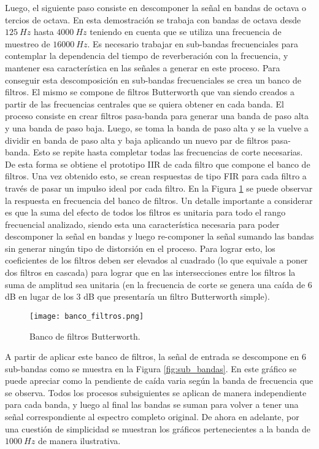 Luego, el siguiente paso consiste en descomponer la señal en bandas de octava o tercios de octava. En esta demostración se trabaja con bandas de octava desde $125 \ Hz$ hasta $4000 \ Hz$ teniendo en cuenta que se utiliza una frecuencia de muestreo de $16000 \ Hz$. Es necesario trabajar en sub-bandas frecuenciales para contemplar la dependencia del tiempo de reverberación con la frecuencia, y mantener esa característica en las señales a generar en este proceso. Para conseguir esta descomposición en sub-bandas frecuenciales se crea un banco de filtros. El mismo se compone de filtros Butterworth que van siendo creados a partir de las frecuencias centrales que se quiera obtener en cada banda. El proceso consiste en crear filtros pasa-banda para generar una banda de paso alta y una banda de paso baja. Luego, se toma la banda de paso alta y se la vuelve a dividir en banda de paso alta y baja aplicando un nuevo par de filtros pasa-banda. Esto se repite hasta completar todas las frecuencias de corte necesarias. De esta forma se obtiene el prototipo IIR de cada filtro que compone el banco de filtros. Una vez obtenido esto, se crean respuestas de tipo FIR para cada filtro a través de pasar un impulso ideal por cada filtro. En la Figura \ref{fig:banco_filtros} se puede observar la respuesta en frecuencia del banco de filtros. Un detalle importante a considerar es que la suma del efecto de todos los filtros es unitaria para todo el rango frecuencial analizado, siendo esta una característica necesaria para poder descomponer la señal en bandas y luego re-componer la señal sumando las bandas sin generar ningún tipo de distorsión en el proceso. Para lograr esto, los coeficientes de los filtros deben ser elevados al cuadrado (lo que equivale a poner dos filtros en cascada) para lograr que en las intersecciones entre los filtros la suma de amplitud sea unitaria (en la frecuencia de corte se genera una caída de 6 dB en lugar de los 3 dB que presentaría un filtro Butterworth simple). 

\begin{figure}[H]
	\centering{}
	\texttt{[image: banco\_filtros.png]}
	\caption{Banco de filtros Butterworth.}
	\label{fig:banco_filtros}
\end{figure}

A partir de aplicar este banco de filtros, la señal de entrada se descompone en 6 sub-bandas como se muestra en la Figura \ref{fig:sub_bandas}. En este gráfico se puede apreciar como la pendiente de caída varia según la banda de frecuencia que se observa. Todos los procesos subsiguientes se aplican de manera independiente para cada banda, y luego al final las bandas se suman para volver a tener una señal correspondiente al espectro completo original. De ahora en adelante, por una cuestión de simplicidad se muestran los gráficos pertenecientes a la banda de $1000 \ Hz$ de manera ilustrativa.

